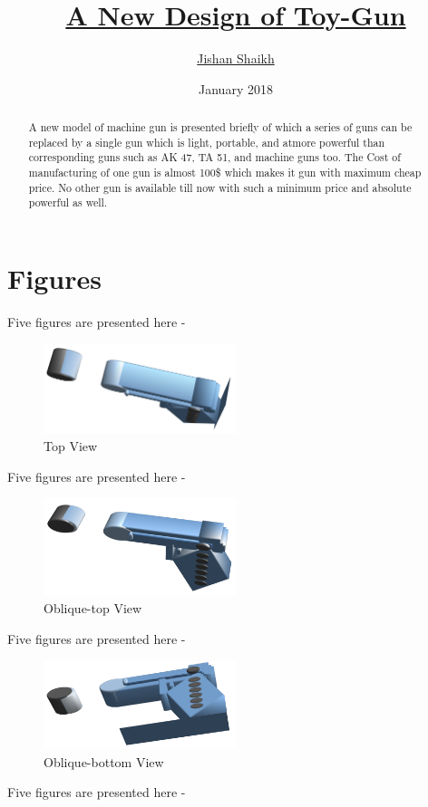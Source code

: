 \documentclass[]{article}
\title{\href{https://www.github.com/}{A New Design of Toy-Gun}}
\author{\href{mailto:jishanshaikh9893@gmail.com}{Jishan Shaikh}}
\date{January 2018}
\begin{document}
\maketitle

\begin{abstract}
A new model of machine gun is presented briefly of which a series of guns can be replaced by a single gun which is light, portable, and atmore powerful than corresponding guns such as AK 47, TA 51, and machine guns too. The Cost of manufacturing of one gun is almost 100\$ which makes it gun with maximum cheap price. No other gun is available till now with such a minimum price and absolute powerful as well.
\end{abstract}

\section{Figures}Five figures are presented here -
\begin{figure}[h]
	\centering
	\includegraphics[width=0.5\textwidth]{1.png}
	\caption{Top View}
	\label{image-1}
\end{figure}Five figures are presented here -
\begin{figure}[h]
	\centering
	\includegraphics[width=0.5\textwidth]{2.png}
	\caption{Oblique-top View}
	\label{image-2}
\end{figure}Five figures are presented here -
\begin{figure}[h]
	\centering
	\includegraphics[width=0.5\textwidth]{3.png}
	\caption{Oblique-bottom View}
	\label{image-3}
\end{figure}Five figures are presented here -
\end{document}
